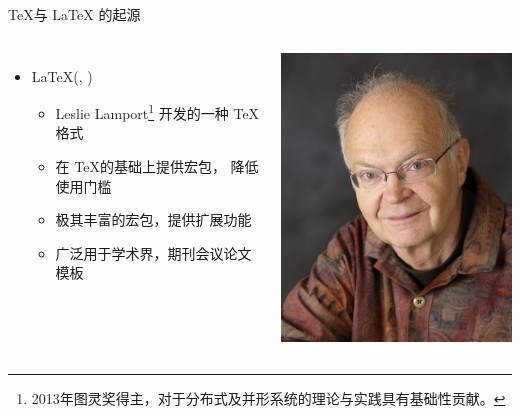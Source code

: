 \begin{frame}[fragile]{\TeX 与 \LaTeX{} 的起源}
\begin{columns}[T]
\begin{itemize}
        \vspace{2em}
      \item \LaTeX{}(, )
        \begin{itemize}
          \item Leslie Lamport\footnote{2013年图灵奖得主，对于分布式及并形系统的理论与实践具有基础性贡献。} 开发的一种 \TeX 格式
          \item 在 \TeX 的基础上提供宏包， 降低使用门槛
          \item 极其丰富的宏包，提供扩展功能
          \item 广泛用于学术界，期刊会议论文模板
        \end{itemize}
    \end{itemize}
    \vspace*{-5mm}
    \hspace{-10mm} \includegraphics[width=\textwidth]{Knuth.jpg}


\end{columns}
\end{frame}
